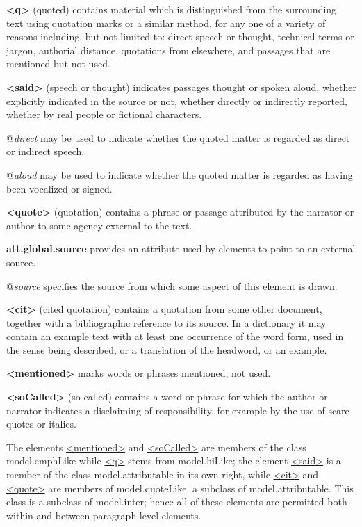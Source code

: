 \begin{sansreflist}
\item [\textbf{<q>}] (quoted) contains material which is distinguished from the surrounding text using quotation marks or a similar method, for any one of a variety of reasons including, but not limited to: direct speech or thought, technical terms or jargon, authorial distance, quotations from elsewhere, and passages that are mentioned but not used.
\item [\textbf{<said>}] (speech or thought) indicates passages thought or spoken aloud, whether explicitly indicated in the source or not, whether directly or indirectly reported, whether by real people or fictional characters.\hfil\\[-10pt]\begin{sansreflist}
    \item[@{\itshape direct}]
  may be used to indicate whether the quoted matter is regarded as direct or indirect speech.
    \item[@{\itshape aloud}]
  may be used to indicate whether the quoted matter is regarded as having been vocalized or signed.
\end{sansreflist}  
\item [\textbf{<quote>}] (quotation) contains a phrase or passage attributed by the narrator or author to some agency external to the text.
\item [\textbf{att.global.source}] provides an attribute used by elements to point to an external source.\hfil\\[-10pt]\begin{sansreflist}
    \item[@{\itshape source}]
  specifies the source from which some aspect of this element is drawn.
\end{sansreflist}  
\item [\textbf{<cit>}] (cited quotation) contains a quotation from some other document, together with a bibliographic reference to its source. In a dictionary it may contain an example text with at least one occurrence of the word form, used in the sense being described, or a translation of the headword, or an example.
\item [\textbf{<mentioned>}] marks words or phrases mentioned, not used.
\item [\textbf{<soCalled>}] (so called) contains a word or phrase for which the author or narrator indicates a disclaiming of responsibility, for example by the use of scare quotes or italics.
\end{sansreflist}
 The elements \hyperref[TEI.mentioned]{<mentioned>} and \hyperref[TEI.soCalled]{<soCalled>} are members of the class \textsf{model.emphLike} while \hyperref[TEI.q]{<q>} stems from \textsf{model.hiLike}; the element \hyperref[TEI.said]{<said>} is a member of the class \textsf{model.attributable} in its own right, while \hyperref[TEI.cit]{<cit>} and \hyperref[TEI.quote]{<quote>} are members of \textsf{model.quoteLike}, a subclass of \textsf{model.attributable}. This class is a subclass of \textsf{model.inter}; hence all of these elements are permitted both within and between paragraph-level elements.\par

